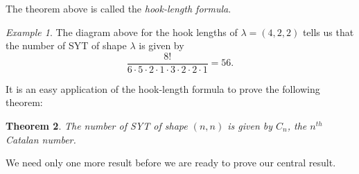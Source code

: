 \documentclass[11pt,letterpaper,twoside,english]{article}
\theoremstyle{theorem}
\newtheorem{theorem}{Theorem}[section]
\theoremstyle{remark}
\newtheorem{example}[theorem]{Example}
\begin{document}
The theorem above is called the \emph{hook-length formula}.

\begin{example}
The diagram above for the hook lengths of $\lambda=(4, 2, 2)$ tells us that the number of SYT of shape $\lambda$ is given by
\[\frac{8!}{6\cdot 5\cdot 2 \cdot 1 \cdot 3 \cdot 2 \cdot 2\cdot 1}=56.\]
\end{example}

It is an easy application of the hook-length formula to prove the following theorem:

\begin{theorem}
\label{catalan_2}
The number of SYT of shape $(n, n)$ is given by $C_n$, the $n^{th}$ Catalan number.
\end{theorem}

We need only one more result before we are ready to prove our central result.
\end{document}
